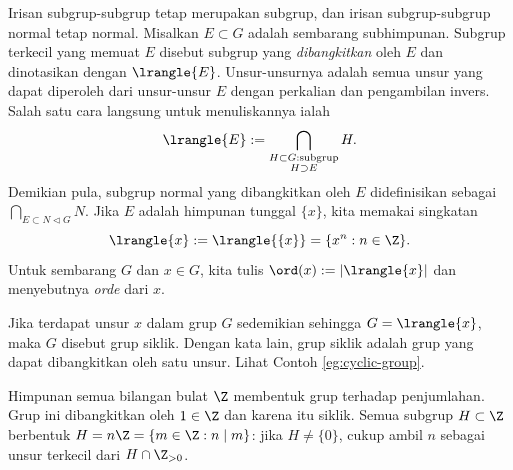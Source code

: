 Irisan subgrup-subgrup tetap merupakan subgrup, dan irisan subgrup-subgrup normal tetap normal. Misalkan $E\subset G$ adalah sembarang subhimpunan. Subgrup terkecil yang memuat $E$ disebut subgrup yang \emph{dibangkitkan} oleh $E$ dan dinotasikan dengan $\lrangle{E}$. Unsur-unsurnya adalah semua unsur yang dapat diperoleh dari unsur-unsur $E$ dengan perkalian dan pengambilan invers. Salah satu cara langsung untuk menuliskannya ialah 
\[ \lrangle{E} := \bigcap_{\substack{H \subset G: \text{subgrup} \\ H \supset E}} H. \]
Demikian pula, subgrup normal yang dibangkitkan oleh $E$ didefinisikan sebagai $\bigcap_{E \subset N \lhd G}N$. Jika $E$ adalah himpunan tunggal $\{x\}$, kita memakai singkatan
\[ \lrangle{x} := \lrangle{\{x\}} = \{ x^n : n \in \Z \}. \]
Untuk sembarang $G$ dan $x\in G$, kita tulis $\ord(x):=|\lrangle{x}|$ dan menyebutnya \emph{orde} dari $x$. 

\begin{definition}\label{def:cyclic-group}
	Jika terdapat unsur $x$ dalam grup $G$ sedemikian sehingga $G=\lrangle{x}$, maka $G$ disebut grup siklik. Dengan kata lain, grup siklik adalah grup yang dapat dibangkitkan oleh satu unsur. Lihat Contoh \ref{eg:cyclic-group}.
\end{definition}

\begin{example}\label{eg:Z-as-group}
	Himpunan semua bilangan bulat $\Z$ membentuk grup terhadap penjumlahan. Grup ini dibangkitkan oleh $1\in\Z$ dan karena itu siklik. Semua subgrup $H\subset\Z$ berbentuk $H=n\Z=\{m\in\Z:n\mid m\}$: jika $H\neq\{0\}$, cukup ambil $n$ sebagai unsur terkecil dari $H\cap\Z_{>0}$.
\end{example}

